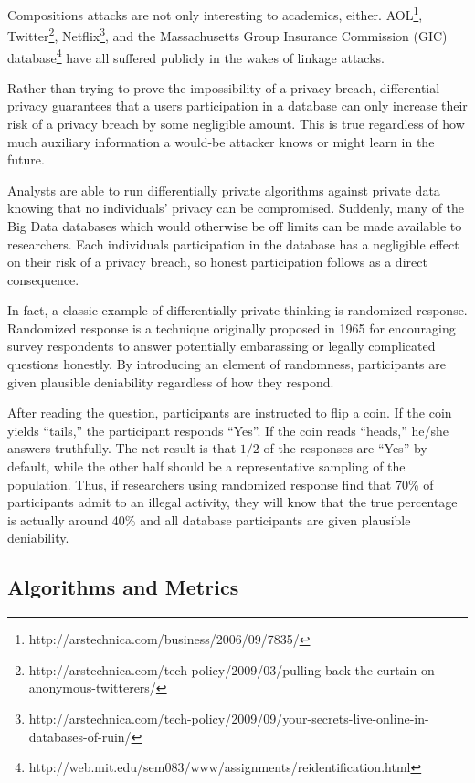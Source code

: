 \documentclass[12pt]{report}
\begin{document}
Compositions attacks are not only interesting to academics, either.
AOL\footnote{\label{fn:aol} http://arstechnica.com/business/2006/09/7835/}, Twitter\footnote{\label{fn:twitter}http://arstechnica.com/tech-policy/2009/03/pulling-back-the-curtain-on-anonymous-twitterers/}, Netflix\footnote{\label{fn:netflix}http://arstechnica.com/tech-policy/2009/09/your-secrets-live-online-in-databases-of-ruin/}, and the Massachusetts Group Insurance Commission (GIC) database\footnote{\label{fn:gic}http://web.mit.edu/sem083/www/assignments/reidentification.html} have all suffered publicly in the wakes of linkage attacks.

Rather than trying to prove the impossibility of a privacy breach, differential privacy guarantees that a users participation in a database can only increase their risk of a privacy breach by some negligible amount.
This is true regardless of how much auxiliary information a would-be attacker knows or might learn in the future.

Analysts are able to run differentially private algorithms against private data knowing that no individuals' privacy can be compromised.
Suddenly, many of the Big Data databases which would otherwise be off limits can be made available to researchers.
Each individuals participation in the database has a negligible effect on their risk of a privacy breach, so honest participation follows as a direct consequence.

In fact, a classic example of differentially private thinking is randomized response.
Randomized response is a technique originally proposed in 1965 for encouraging survey respondents to answer potentially embarassing or legally complicated questions honestly\cite{warner1965randomized}.
By introducing an element of randomness, participants are given plausible deniability regardless of how they respond.

After reading the question, participants are instructed to flip a coin.
If the coin yields ``tails,'' the participant responds ``Yes''.
If the coin reads ``heads,'' he/she answers truthfully.
The net result is that $1/2$ of the responses are ``Yes'' by default, while the other half should be a representative sampling of the population.
Thus, if researchers using randomized response find that 70\% of participants admit to an illegal activity, they will know that the true percentage is actually around 40\% and all database participants are given plausible deniability.

\subsection{Algorithms and Metrics}
\end{document}
